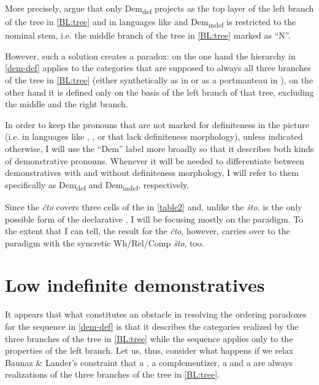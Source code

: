 More precisely, \cite{BaunazLander2018} argue that only Dem\textsubscript{def} projects as the top layer of the left branch of the tree in \ref{BL:tree} and in languages like  and  Dem\textsubscript{indef} is restricted to the nominal stem, i.e. the middle branch of the tree in \ref{BL:tree} marked as ``N''. 
\par
However, such a solution creates a paradox: on the one hand the hierarchy in \ref{dem-def} 
applies to the categories that are supposed to always  all three branches of the tree in \ref{BL:tree} (either synthetically as in  or as a portmanteau in ), on the other hand it is defined only on the basis of the left branch of that tree, excluding the middle and the right branch.
\par
 In order to keep the  pronouns that are not marked for definiteness in the picture (i.e. in  languages like , , or  that lack definiteness morphology), unless indicated otherwise, I will use the ``Dem'' label more broadly so that it describes both kinds of demonstrative pronouns. Whenever it will be needed to differentiate between demonstratives with and without definiteness morphology, I will refer to them specifically as Dem\textsubscript{def} and Dem\textsubscript{indef}, respectively.
 \par
Since the  \textit{\v{c}to} covers three cells of the  in \ref{table2}  and, unlike the  \textit{\v{s}to}, is the only possible form of the declarative , I will be focusing mostly on the  paradigm. To the extent that I can tell, the result for the  \textit{\v{c}to}, however, carries over to the  paradigm with the syncretic Wh/Rel/Comp \textit{\v{s}to}, too.

\section{Low indefinite demonstratives}

\noindent It appears that what constitutes an obstacle in resolving the ordering paradoxes for the sequence in \ref{dem-def} is that it describes the categories realized by the three branches of the tree in \ref{BL:tree} while the sequence applies only to the properties of the left branch. Let us, thus, consider what happens if we relax Baunaz \& Lander's constraint that a , a complementizer, a  and a  are always realizations of the three branches of the tree in \ref{BL:tree}.

